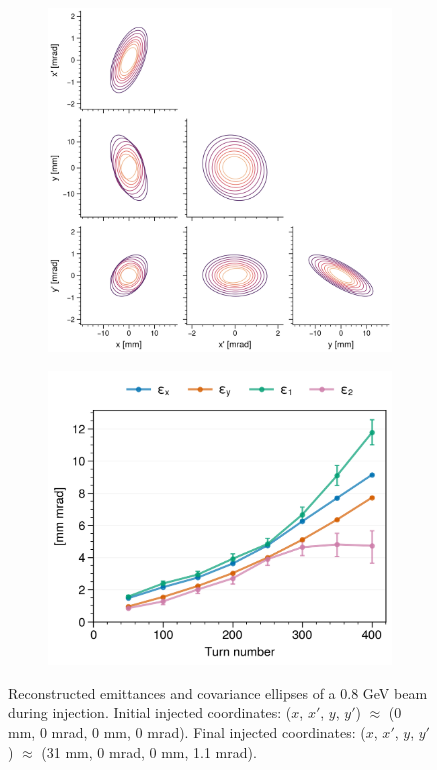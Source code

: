 \begin{figure}[!p]
    \centering
    \begin{subfigure}{0.6\textwidth}
        \includegraphics[width=\textwidth]{Images/chapter5/exp3/corner.png}
    \end{subfigure}
    \hfill
    \begin{subfigure}[t]{0.39\textwidth}
        \includegraphics[width=\textwidth]{Images/chapter5/exp3/emittances.png}
    \end{subfigure}
    \caption{Reconstructed emittances and covariance ellipses of a 0.8 GeV beam during injection. Initial injected coordinates: ($x$, $x'$, $y$, $y'$) $\approx$ (0 mm, 0 mrad, 0 mm, 0 mrad). Final injected coordinates: ($x$, $x'$, $y$, $y'$) $\approx$ (31 mm, 0 mrad, 0 mm, 1.1 mrad).}
    \label{fig:exp3_emittances}
\end{figure}
%

